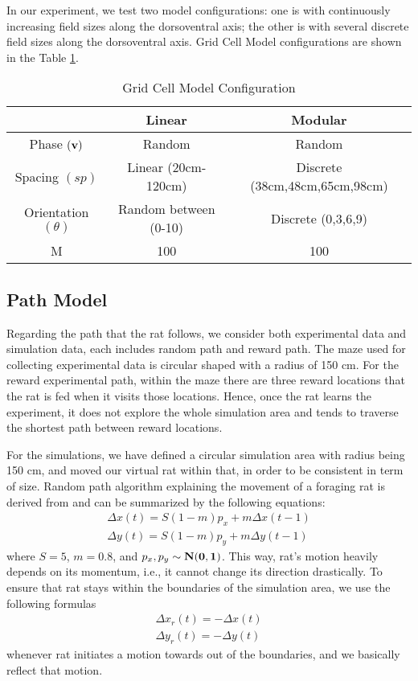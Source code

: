 \documentclass[11pt, letterpaper, onecolumn]{article}
\begin{document}
In our experiment, we test two model configurations: one is with continuously increasing field sizes along the dorsoventral axis; the other is with several discrete field sizes along the dorsoventral axis. Grid Cell Model configurations are shown in the Table \ref{tab:grid}.
\begin{table}[!htbp]
\centering
\caption{Grid Cell Model Configuration}
\label{tab:grid}
\begin{tabular}{c|c|c}
\hline
       & Linear      & Modular  \\ \hline
       Phase $(\bf{v})$ & Random      & Random  \\ \hline
       Spacing $(sp)$ & Linear (20cm-120cm)  &  Discrete (38cm,48cm,65cm,98cm) \\ \hline
       Orientation $(\theta)$ & Random between (0-10)    & Discrete (0,3,6,9)     \\ \hline
       M & 100 & 100      \\ \hline
\end{tabular}
\end{table}

\subsection{Path Model}
Regarding the path that the rat follows, we consider both experimental data and simulation data, each includes random path and reward path. The maze used for collecting experimental data is circular shaped with a radius of 150 cm. For the reward experimental path, within the maze there are three reward locations that the rat is fed when it visits those locations. Hence, once the rat learns the experiment, it does not explore the whole simulation area and tends to traverse the shortest path between reward locations.

For the simulations, we have defined a circular simulation area with radius being 150 cm, and moved our virtual rat within that, in order to be consistent in term of size. Random path algorithm explaining the movement of a foraging rat is derived from \cite{Hasselmo:Grid07} and can be summarized by the following equations:
\begin{equation}
\label{eq:path}
\begin{array}{cc}
\Delta x(t) = S(1-m)p_{x} + m\Delta x(t-1)\\
\Delta y(t) = S(1-m)p_{y} + m\Delta y(t-1)
\end{array}
\end{equation}
where $ S = 5 $, $ m = 0.8 $, and $ p_{x}, p_{y} \sim \bf{N}(0,1) $. This  way, rat's motion heavily depends on its momentum, i.e., it cannot change its direction drastically. To ensure that rat stays within  the boundaries of the simulation area, we use the following formulas
\begin{equation}
\begin{array}{cc}
\Delta x_{r}(t) = - \Delta x(t)\\
\Delta y_{r}(t) = - \Delta y(t)
\end{array}
\end{equation}
whenever rat initiates a motion towards out of the boundaries, and we basically reflect that motion. 
\end{document}

